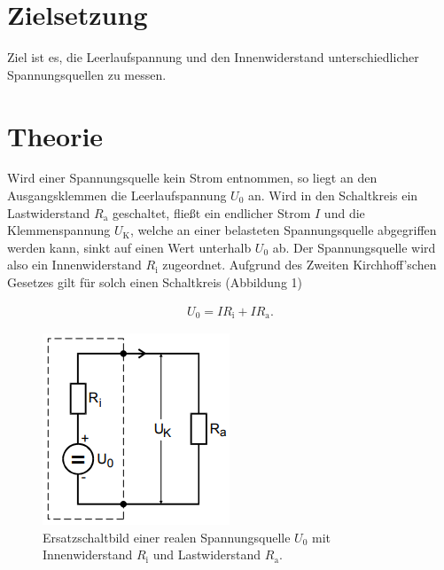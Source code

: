 \section{Zielsetzung}
\label{sec:Zielsetzung}
Ziel ist es, die Leerlaufspannung und den Innenwiderstand unterschiedlicher
Spannungsquellen zu messen.

\section{Theorie}
\label{sec:Theorie}
Wird einer Spannungsquelle kein Strom entnommen, so liegt an den Ausgangsklemmen
die Leerlaufspannung $U_\text{0}$ an. Wird in den Schaltkreis ein Lastwiderstand
$R_\text{a}$ geschaltet, fließt ein endlicher Strom $I$ und die Klemmenspannung
$U_\text{K}$, welche an einer belasteten Spannungsquelle abgegriffen werden kann,
sinkt auf einen Wert unterhalb $U_\text{0}$ ab. Der Spannungsquelle wird also ein
Innenwiderstand $R_\text{i}$ zugeordnet. Aufgrund des Zweiten Kirchhoff'schen Gesetzes gilt
für solch einen Schaltkreis (Abbildung 1)

\begin{align*}
U_\text{0} = I R_\text{i} + I R_\text{a}.
\end{align*}

\begin{figure}
  \centering
  \includegraphics{schalt1.png}
  \caption{Ersatzschaltbild einer realen Spannungsquelle $U_\text{0}$ mit 
  Innenwiderstand $R_\text{i}$ und Lastwiderstand $R_\text{a}$. \cite[S. 1]{l}}
  \label{fig:schaltung1}
\end{figure}

